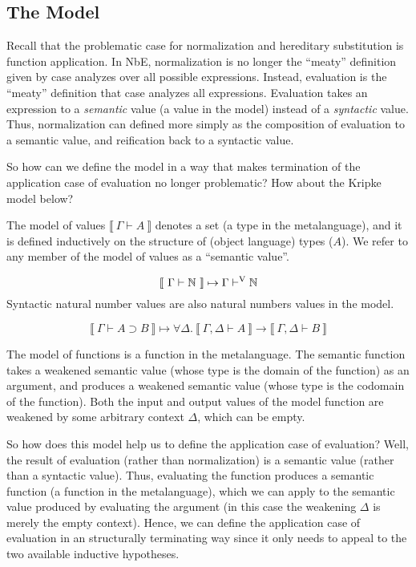 \documentclass{llncs}
\newenvironment{mydefinition}[3]
{ \begin{mydefinition'}[#1] \label{def:#2}
  \hfill\break
  #3
}
{ \end{mydefinition'} }
\def\dfn{\mapsto}
\def\arr{\supset}
\def\marr{\rightarrow}
\def\nat{\mathbb{N}}
\newcommand{\turn}[1]{\vdash^\con{#1}}
\newcommand{\all}[1]{\forall#1.~}
\newcommand{\els}[1]{\llbracket ~ #1 ~ \rrbracket}
\newcommand{\con}[1]{\textmd{#1}}
\newcommand{\typm}[1]{\els{\Gamma \vdash #1}}
\newcommand{\gdtypm}[1]{\els{\Gamma, \Delta \vdash #1}}
\newcommand{\typv}[1]{\Gamma \turn{V} #1}
\begin{document}
\subsection{The Model}

Recall that the problematic case for normalization and hereditary
substitution is function application. In NbE, normalization is no
longer the ``meaty'' definition given by case analyzes over all
possible expressions. Instead, evaluation is the ``meaty'' definition
that case analyzes all expressions. Evaluation takes an expression
to a \textit{semantic} value (a value in the model) instead of a
\textit{syntactic} value.
Thus, normalization can defined more simply as the composition of
evaluation to a semantic value, and reification back to a syntactic value.

So how can we define the model in a way that makes termination of the
application case of evaluation no longer problematic? How about the
Kripke model below?

\begin{mydefinition}{Semantic Values}{mval}
{
The model of values $\typm{A}$ denotes a set (a type in the
metalanguage), and it is defined inductively on the structure
of (object language) types ($A$). We refer to any member of the model
of values as a ``semantic value''.
}

\begin{mycase}
$$
\typm{\nat} \dfn \typv{\nat}
$$
Syntactic natural number values are also natural numbers values in the
model.
\end{mycase}

\begin{mycase}[Functions]
$$
\typm{A \arr B} \dfn \all{\Delta} \gdtypm{A} \marr \gdtypm{B}
$$

The model of functions is a function in the metalanguage.
The semantic function takes a weakened semantic value (whose type is
the domain of the function) as an argument, and produces a
weakened semantic value (whose type is the codomain of the
function). Both the input and output values of the model function are
weakened by some arbitrary context $\Delta$, which can be empty.
\end{mycase}

\end{mydefinition}

So how does this model help us to define the application case of
evaluation? Well, the result of evaluation (rather than
normalization) is a semantic value (rather than a syntactic value).
Thus, evaluating the function produces a semantic
function (a function in the metalanguage), which we can apply to the semantic value produced by evaluating
the argument (in this case the weakening $\Delta$ is merely the empty
context). Hence, we can define the application case of evaluation in
an structurally terminating way since it only needs to appeal to the
two available inductive hypotheses.
\end{document}
